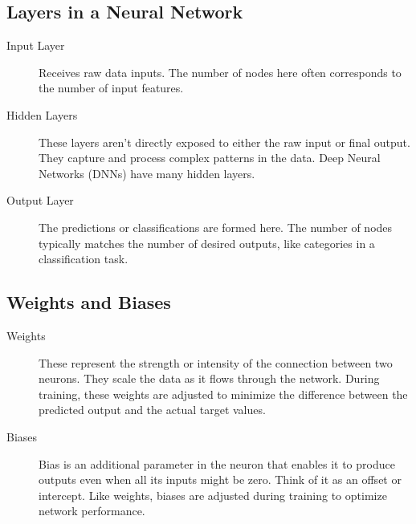 \subsection{Layers in a Neural Network}
\begin{description}
	\item[Input Layer] Receives raw data inputs. The number of nodes here often corresponds to the number of input features.
	\item[Hidden Layers] These layers aren't directly exposed to either the raw input or final output. They capture and process complex patterns in the data. Deep Neural Networks (DNNs) have many hidden layers.
	\item[Output Layer] The predictions or classifications are formed here. The number of nodes typically matches the number of desired outputs, like categories in a classification task.
\end{description}

\subsection{Weights and Biases}
\begin{description}
	\item[Weights] These represent the strength or intensity of the connection between two neurons. They scale the data as it flows through the network. During training, these weights are adjusted to minimize the difference between the predicted output and the actual target values.
	\item[Biases] Bias is an additional parameter in the neuron that enables it to produce outputs even when all its inputs might be zero. Think of it as an offset or intercept. Like weights, biases are adjusted during training to optimize network performance.
\end{description}

